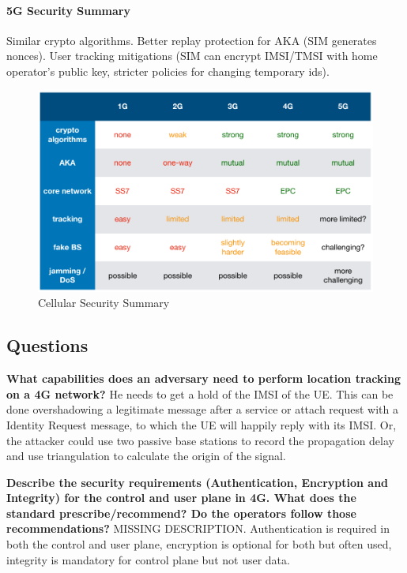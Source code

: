 \paragraph{5G Security Summary}
Similar crypto algorithms. Better replay protection for AKA (SIM generates
nonces). User tracking mitigations (SIM can encrypt IMSI/TMSI with home
operator's public key, stricter policies for changing temporary ids).

\begin{figure}[h]
	\centering
	\includegraphics[scale=0.5]{images/10-overview.png}
	\caption{Cellular Security Summary}%
	\label{fig:overview}
\end{figure}

\subsection{Questions}

\textbf{What capabilities does an adversary need to perform location tracking on a 4G network?} He needs to get a hold of the IMSI of the UE. This can be done overshadowing a legitimate message after a service or attach request with a Identity Request message, to which the UE will happily reply with its IMSI. Or, the attacker could use two passive base stations to record the propagation delay and use triangulation to calculate the origin of the signal.

\textbf{Describe the security requirements (Authentication, Encryption and Integrity) for the control and user plane in 4G. What does the standard prescribe/recommend? Do the operators follow those recommendations?} MISSING DESCRIPTION. Authentication is required in both the control and user plane, encryption is optional for both but often used, integrity is mandatory for control plane but not user data.
